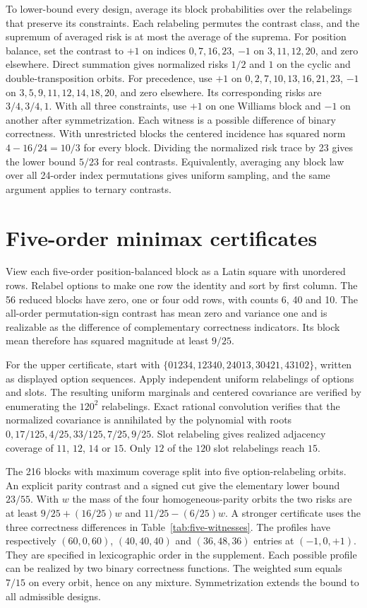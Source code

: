 To lower-bound every design, average its block probabilities over the
relabelings that preserve its constraints. Each relabeling permutes
the contrast class, and the supremum of averaged risk is at most
the average of the suprema. For position balance, set the contrast
to \(+1\) on indices \(0,7,16,23\), \(-1\) on \(3,11,12,20\), and
zero elsewhere. Direct summation gives normalized risks \(1/2\)
and \(1\) on the cyclic and double-transposition orbits.
For precedence, use \(+1\) on \(0,2,7,10,13,16,21,23\),
\(-1\) on \(3,5,9,11,12,14,18,20\), and zero elsewhere.
Its corresponding risks are \(3/4,3/4,1\). With all three
constraints, use \(+1\) on one Williams block and \(-1\) on another
after symmetrization. Each witness is a possible difference of binary
correctness. With unrestricted blocks the centered incidence has
squared norm \(4-16/24=10/3\) for every block. Dividing the normalized
risk trace by 23 gives the lower bound \(5/23\) for real contrasts.
Equivalently, averaging any block law over all 24-order index
permutations gives uniform sampling, and the same argument applies to
ternary contrasts.

\section{Five-order minimax certificates}
\label{app:five-certificates}
View each five-order position-balanced block as a Latin square with
unordered rows. Relabel options to make one row the identity and
sort by first column. The 56 reduced blocks have zero, one or four
odd rows, with counts 6, 40 and 10. The all-order permutation-sign
contrast has mean zero and variance one and is realizable as the
difference of complementary correctness indicators. Its block mean
therefore has squared magnitude at least $9/25$.

For the upper certificate, start with
$\{01234,12340,24013,30421,43102\}$, written as displayed
option sequences. Apply independent uniform relabelings of options
and slots. The resulting uniform marginals and centered covariance
are verified by enumerating the $120^2$ relabelings. Exact rational
convolution verifies that the normalized covariance is annihilated by
the polynomial with roots $0,17/125,4/25,33/125,7/25,9/25$.
Slot relabeling gives realized adjacency coverage of $11$, $12$,
$14$ or $15$. Only $12$ of the $120$ slot relabelings reach $15$.

The 216 blocks with maximum coverage split into five option-relabeling
orbits. An explicit parity contrast and a signed cut give the elementary
lower bound $23/55$. With $w$ the mass of the four homogeneous-parity
orbits the two risks are at least $9/25+(16/25)w$ and
$11/25-(6/25)w$. A stronger certificate uses the three correctness
differences in Table~\ref{tab:five-witnesses}. The profiles have
respectively $(60,0,60)$, $(40,40,40)$ and $(36,48,36)$ entries at
$(-1,0,+1)$. They are specified in lexicographic order in the
supplement. Each possible profile can be realized by two binary
correctness functions. The weighted sum equals $7/15$ on every
orbit, hence on any mixture. Symmetrization extends the bound to all
admissible designs.

